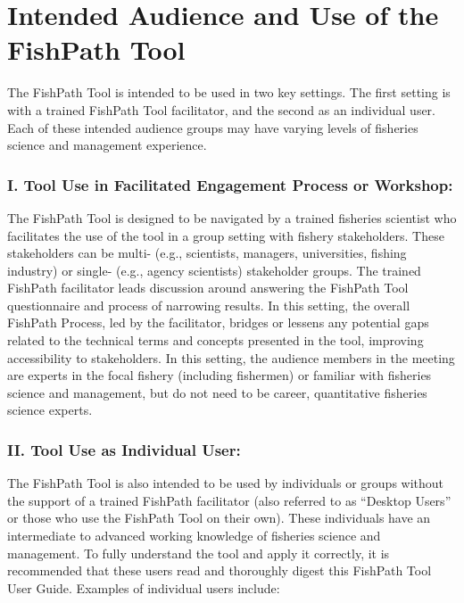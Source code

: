 \documentclass[
  11pt,
]{book}
\begin{document}
\hypertarget{intended-audience-and-use-of-the-fishpath-tool}{%
\section{Intended Audience and Use of the FishPath Tool}\label{intended-audience-and-use-of-the-fishpath-tool}}

The FishPath Tool is intended to be used in two key settings. The first setting is with a trained FishPath Tool facilitator, and the second as an individual user. Each of these intended audience groups may have varying levels of fisheries science and management experience.

\hypertarget{i.-tool-use-in-facilitated-engagement-process-or-workshop}{%
\subsubsection{I. Tool Use in Facilitated Engagement Process or Workshop:}\label{i.-tool-use-in-facilitated-engagement-process-or-workshop}}

The FishPath Tool is designed to be navigated by a trained fisheries scientist who facilitates the use of the tool in a group setting with fishery stakeholders. These stakeholders can be multi- (e.g., scientists, managers, universities, fishing industry) or single- (e.g., agency scientists) stakeholder groups. The trained FishPath facilitator leads discussion around answering the FishPath Tool questionnaire and process of narrowing results. In this setting, the overall FishPath Process, led by the facilitator, bridges or lessens any potential gaps related to the technical terms and concepts presented in the tool, improving accessibility to stakeholders. In this setting, the audience members in the meeting are experts in the focal fishery (including fishermen) or familiar with fisheries science and management, but do not need to be career, quantitative fisheries science experts.

\hypertarget{ii.-tool-use-as-individual-user}{%
\subsubsection{II. Tool Use as Individual User:}\label{ii.-tool-use-as-individual-user}}

The FishPath Tool is also intended to be used by individuals or groups without the support of a trained FishPath facilitator (also referred to as ``Desktop Users'' or those who use the FishPath Tool on their own). These individuals have an intermediate to advanced working knowledge of fisheries science and management. To fully understand the tool and apply it correctly, it is recommended that these users read and thoroughly digest this FishPath Tool User Guide. Examples of individual users include:
\end{document}
